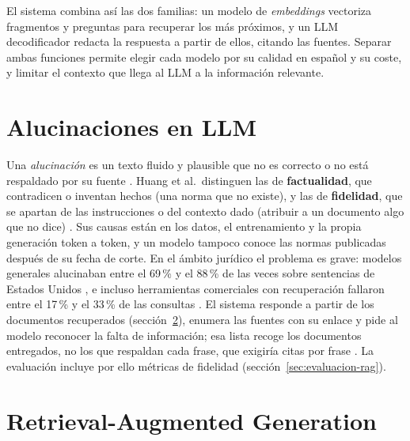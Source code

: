 El sistema combina así las dos familias: un modelo de \emph{embeddings} vectoriza fragmentos y preguntas para recuperar los más próximos, y un LLM decodificador redacta la respuesta a partir de ellos, citando las fuentes. Separar ambas funciones permite elegir cada modelo por su calidad en español y su coste, y limitar el contexto que llega al LLM a la información relevante.

\section{Alucinaciones en LLM}
\label{sec:alucinaciones}

Una \emph{alucinación} es un texto fluido y plausible que no es correcto o no está respaldado por su fuente \cite{ji2023survey}. Huang et al.\ distinguen las de \textbf{factualidad}, que contradicen o inventan hechos (una norma que no existe), y las de \textbf{fidelidad}, que se apartan de las instrucciones o del contexto dado (atribuir a un documento algo que no dice) \cite{huang2023}. Sus causas están en los datos, el entrenamiento y la propia generación token a token, y un modelo tampoco conoce las normas publicadas después de su fecha de corte. En el ámbito jurídico el problema es grave: modelos generales alucinaban entre el 69\,\% y el 88\,\% de las veces sobre sentencias de Estados Unidos \cite{dahl2024}, e incluso herramientas comerciales con recuperación fallaron entre el 17\,\% y el 33\,\% de las consultas \cite{magesh2025}. El sistema responde a partir de los documentos recuperados (sección~\ref{sec:rag}), enumera las fuentes con su enlace y pide al modelo reconocer la falta de información; esa lista recoge los documentos entregados, no los que respaldan cada frase, que exigiría citas por frase \cite{gao2023alce}. La evaluación incluye por ello métricas de fidelidad (sección~\ref{sec:evaluacion-rag}).

\section{Retrieval-Augmented Generation}
\label{sec:rag}

